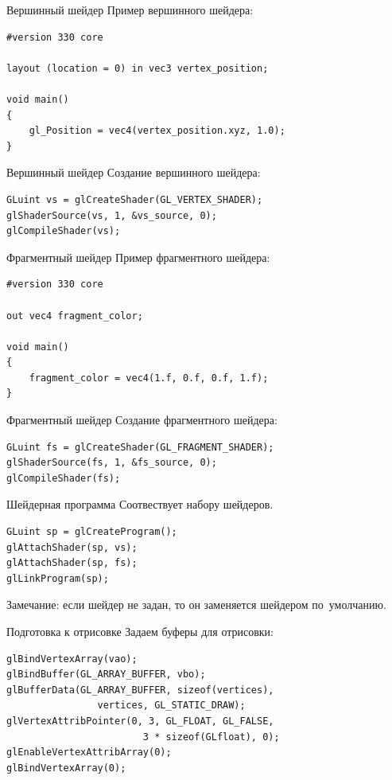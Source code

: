 \documentclass[aspectration=1610,t]{beamer}
\begin{document}
\begin{frame}[fragile]{Вершинный шейдер}
    Пример вершинного шейдера:
    {\small \begin{lstlisting}
#version 330 core

layout (location = 0) in vec3 vertex_position;

void main()
{
    gl_Position = vec4(vertex_position.xyz, 1.0);
}
    \end{lstlisting}}
\end{frame}

\begin{frame}[fragile]{Вершинный шейдер}
    Создание вершинного шейдера:
    {\small \begin{lstlisting}
GLuint vs = glCreateShader(GL_VERTEX_SHADER);
glShaderSource(vs, 1, &vs_source, 0);
glCompileShader(vs);
    \end{lstlisting}}
\end{frame}

\begin{frame}[fragile]{Фрагментный шейдер}
    Пример фрагментного шейдера:
    {\small \begin{lstlisting}
#version 330 core

out vec4 fragment_color;

void main()
{
    fragment_color = vec4(1.f, 0.f, 0.f, 1.f);
}
    \end{lstlisting}}
\end{frame}

\begin{frame}[fragile]{Фрагментный шейдер}
    Создание фрагментного шейдера:
    {\small \begin{lstlisting}
GLuint fs = glCreateShader(GL_FRAGMENT_SHADER);
glShaderSource(fs, 1, &fs_source, 0);
glCompileShader(fs);
    \end{lstlisting}}
\end{frame}

\begin{frame}[fragile]{Шейдерная программа}
    Соотвествует набору шейдеров.
    {\small \begin{lstlisting}
GLuint sp = glCreateProgram();
glAttachShader(sp, vs);
glAttachShader(sp, fs);
glLinkProgram(sp);
    \end{lstlisting}}
    Замечание: если шейдер не задан, то он заменяется шейдером по~умолчанию.
\end{frame}

\begin{frame}[fragile]{Подготовка к отрисовке}
    Задаем буферы для отрисовки:
    {\small \begin{lstlisting}
glBindVertexArray(vao);
glBindBuffer(GL_ARRAY_BUFFER, vbo); 
glBufferData(GL_ARRAY_BUFFER, sizeof(vertices),
                vertices, GL_STATIC_DRAW); 
glVertexAttribPointer(0, 3, GL_FLOAT, GL_FALSE,
                        3 * sizeof(GLfloat), 0);
glEnableVertexAttribArray(0);
glBindVertexArray(0);
    \end{lstlisting}}
\end{frame}
\end{document}
